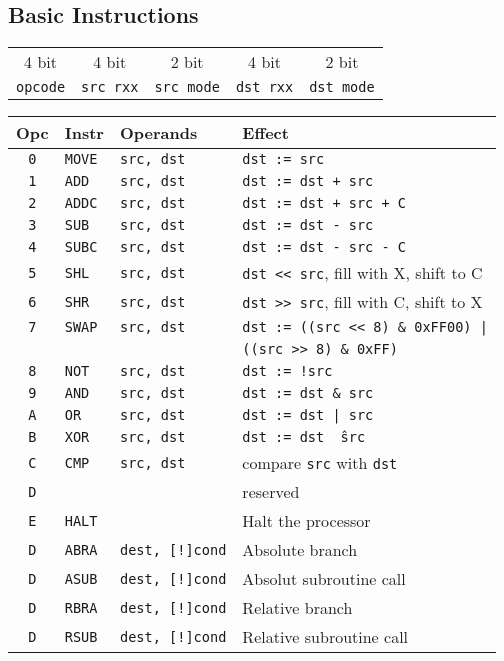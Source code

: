 \documentclass{leaflet}
\begin{document}
  \subsection{Basic Instructions}
   \begin{center}
    \begin{longtable}{|c||c|c||c|c|}
     \hline
     4 bit&4 bit&2 bit&4 bit&2 bit\\
     {\tt opcode}&{\tt src rxx}&{\tt src mode}&
     {\tt dst rxx}&{\tt dst mode}\\
     \hline
    \end{longtable}
   \end{center}
   {\scriptsize
    \begin{center}
     \begin{longtable}{|c|ll|l|}
      \hline
       Opc&Instr&Operands&Effect\\
      \hline
       {\tt 0}&{\tt MOVE}&{\tt src, dst}&{\tt dst := src}\\
       {\tt 1}&{\tt ADD}&{\tt src, dst}&{\tt dst := dst + src}\\
       {\tt 2}&{\tt ADDC}&{\tt src, dst}&{\tt dst := dst + src + C}\\
       {\tt 3}&{\tt SUB}&{\tt src, dst}&{\tt dst := dst - src}\\
       {\tt 4}&{\tt SUBC}&{\tt src, dst}&{\tt dst := dst - src - C}\\
       {\tt 5}&{\tt SHL}&{\tt src, dst}&{\tt dst << src}, fill with X, shift to C\\
       {\tt 6}&{\tt SHR}&{\tt src, dst}&{\tt dst >> src}, fill with C, shift to X\\
       {\tt 7}&{\tt SWAP}&{\tt src, dst}&{\tt dst := ((src << 8) \& 0xFF00) |}\\
              &          &              &{\tt ((src >> 8) \& 0xFF)}\\
       {\tt 8}&{\tt NOT}&{\tt src, dst}&{\tt dst := !src}\\
       {\tt 9}&{\tt AND}&{\tt src, dst}&{\tt dst := dst \& src}\\
       {\tt A}&{\tt OR}&{\tt src, dst}&{\tt dst := dst | src}\\
       {\tt B}&{\tt XOR}&{\tt src, dst}&{\tt dst := dst \^\ src}\\
       {\tt C}&{\tt CMP}&{\tt src, dst}&compare {\tt src} with {\tt dst}\\
       {\tt D}&&&reserved\\
       {\tt E}&{\tt HALT}&&Halt the processor\\
       {\tt D}&{\tt ABRA}&{\tt dest, [!]cond}&Absolute branch\\
       {\tt D}&{\tt ASUB}&{\tt dest, [!]cond}&Absolut subroutine call\\
       {\tt D}&{\tt RBRA}&{\tt dest, [!]cond}&Relative branch\\
       {\tt D}&{\tt RSUB}&{\tt dest, [!]cond}&Relative subroutine call\\
      \hline
     \end{longtable}
    \end{center}
   }
%
\end{document}
